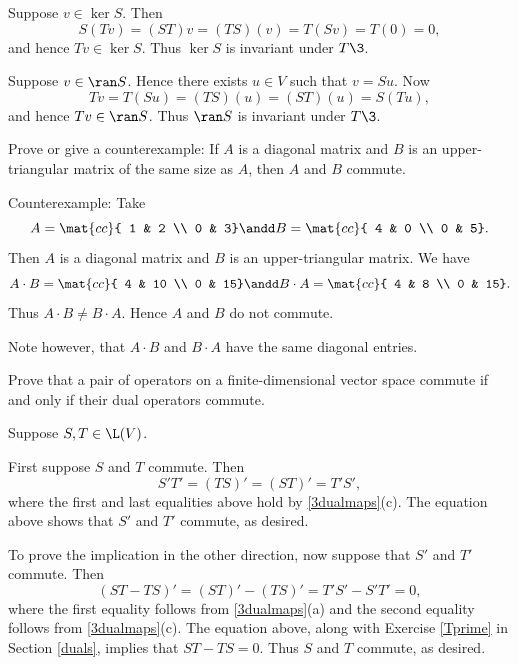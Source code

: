 \begin{Solution}
\begin{subtheorem}
\item
Suppose $v \in \ker S$. Then
\[
S(Tv) = (ST)v = (TS)(v) = T(Sv) = T(0) = 0,
\]
and hence $Tv \in \ker S$. Thus $\ker S$ is invariant under $T\3$.

\item
Suppose $v \in \ran S$. Hence there exists $u \in V$ such that $v = Su$. Now
\[
Tv = T(Su) = (TS)(u) = (ST)(u) = S(Tu),
\]
and hence $Tv \in \ran S$. Thus $\ran S$ is invariant under $T\3$.
\end{subtheorem}
\end{Solution}

\exercise
Prove or give a counterexample: If $A$ is a diagonal matrix and $B$ is an upper-triangular matrix of the same size as $A$, then $A$ and $B$ commute.

\begin{Solution}
Counterexample: Take
\[
A = \mat{cc}{
1 & 2 \\
0 & 3}
\andd
B = \mat{cc}{
4 & 0 \\
0 & 5}.
\]
Then $A$ is a diagonal matrix and $B$ is an upper-triangular matrix. We have
\[
A \cdot B = \mat{cc}{
4 & 10 \\
0 & 15}
\andd
B \cdot A = \mat{cc}{
4 & 8 \\
0 & 15}.
\]
Thus $A \cdot B \ne B \cdot A$. Hence $A$ and $B$ do not commute.

Note however, that $A \cdot B$ and $B \cdot A$ have the same diagonal entries.
\end{Solution}

\exercise
Prove that a pair of operators on a finite-dimensional vector space commute if and only if their dual operators commute.
\label{5dualcom}

\begin{Solution}
Suppose $S, T \in \L(V)$.

First suppose $S$ and $T$ commute. Then
\[
S' T' = (TS)' = (ST)' = T' S',
\]
where the first and last equalities above hold by \ref{3dualmaps}(c). The equation above shows that $S'$ and $T'$ commute, as desired.

To prove the implication in the other direction, now suppose that $S'$ and $T'$ commute. Then
\[
(ST - TS)' = (ST)' - (TS)' = T'S' - S'T' = 0,
\]
where the first equality follows from \ref{3dualmaps}(a) and the second equality follows from \ref{3dualmaps}(c). The equation above, along with Exercise \ref{Tprime} in Section \ref{duals}, implies that $ST - TS = 0$. Thus $S$ and $T$ commute, as desired.
\end{Solution}

